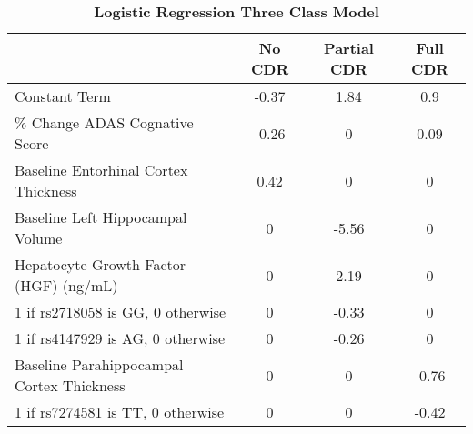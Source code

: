 \documentclass[10pt]{article}
\begin{document}
\begin{table}[!ht]
\caption{
\bf{Logistic Regression Three Class Model}}
\begin{tabular}{|l|c|c|c|}
\hline\hline %
& No CDR  & Partial CDR  & Full CDR \\
\hline
Constant Term & 	-0.37 & 	1.84 & 	0.9 \\
\hline
\% Change ADAS Cognative Score & 	-0.26 & 	0 & 	0.09 \\
\hline
Baseline Entorhinal Cortex Thickness & 	0.42 & 	0 & 	0 \\
\hline
Baseline Left Hippocampal Volume & 	0 & 	-5.56 & 	0 \\
\hline
Hepatocyte Growth Factor (HGF) (ng/mL) & 	0 & 	2.19 & 	0 \\
\hline
1 if rs2718058 is GG, 0 otherwise & 	0 & 	-0.33 & 	0 \\
\hline
1 if rs4147929 is AG, 0 otherwise & 	0 & 	-0.26 & 	0 \\
\hline
Baseline Parahippocampal Cortex Thickness & 	0 & 	0 & 	-0.76 \\
\hline
1 if rs7274581 is TT, 0 otherwise & 	0 & 	0 & 	-0.42  \\
\hline
\end{tabular}
\begin{flushleft}
\end{flushleft}
\label{table:three_class_model} 
\end{table}
\end{document}
